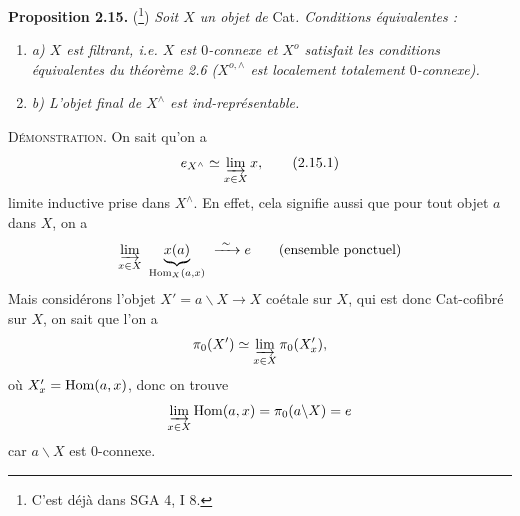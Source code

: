 \noindent\textbf{Proposition 2.15.} (\footnote[39]{C'est déjà dans SGA 4, I 8.}) \textit{Soit $X$ un objet de} Cat\textit{. Conditions équivalentes :}
\begin{enumerate}[label={}, leftmargin=2em, itemsep=0pt]
\item \textit{a) $X$ est filtrant, i.e. $X$ est $0$-connexe et $X^o$ satisfait les conditions équivalentes du théorème 2.6 ($X^{o,\wedge}$ est localement totalement $0$-connexe).}
\item \textit{b) L'objet final de $X^\wedge$ est ind-représentable.}
\end{enumerate}
\noindent\textsc{Démonstration}. On sait qu'on a
\[
e_{X^\wedge} \simeq \varinjlim_{x \in X} x, \tag*{(2.15.1)}
\]
limite inductive prise dans $X^\wedge$. En effet, cela signifie aussi que pour tout objet $a$ dans $X$, on a
\[
\varinjlim_{x \in X} \ \underbrace{x(a)}_{\Hom_X(a,x)} \ \xrightarrow{\ \sim\ } e \qquad \text{(ensemble ponctuel)}
\]
Mais considérons l'objet $X' = a\backslash X \longrightarrow X$ coétale sur $X$, qui est donc Cat-cofibré sur $X$, on sait que l'on a
\[
\pi_0(X') \simeq \varinjlim_{x \in X} \pi_0(X'_x),
\]
où $X'_x = \operatorname{Hom}(a,x)$, donc on trouve
\[
\varinjlim_{x \in X} \operatorname{Hom}(a,x) = \pi_0(a\backslash X) = e
\]
car $a\backslash X$ est 0-connexe.

